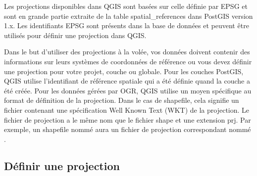 Les projections disponibles dans QGIS sont basées sur celle définie par
EPSG et sont en grande partie extraite de la table
spatial\_references dans PostGIS version 1.x. Les identifiants
EPSG sont présents dans la base de données et peuvent être utilisés pour définir
une projection dans QGIS.

Dans le but d'utiliser des projections à la volée, vos données doivent contenir
des informations sur leurs systèmes de coordonnées de référence ou vous devez
définir une projection pour votre projet, couche ou globale. Pour les couches
PostGIS, QGIS utilise l'identifiant de référence spatiale qui a été définie
quand la couche a été créée. Pour les données gérées par OGR, QGIS utilise un
moyen spécifique au format de définition de la projection. Dans le cas de
shapefile, cela signifie un fichier contenant une spécification Well Known Text
(WKT) de la projection. Le fichier de projection a le même nom que
le fichier shape et une extension prj. Par exemple, un shapefile nommé
 aura un fichier de projection correspondant nommé
.

\subsection{Définir une projection}
\label{sec:projection-specifying}

